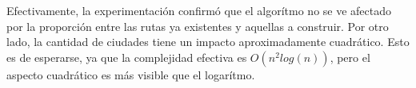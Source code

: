 Efectivamente, la experimentación confirmó que el algorítmo no se ve afectado por la proporción entre las rutas ya existentes y aquellas a construir. Por otro lado, la cantidad de ciudades tiene un impacto aproximadamente cuadrático. Esto es de esperarse, ya que la complejidad efectiva es $O(n^2log(n))$, pero el aspecto cuadrático es más visible que el logarítmo.
